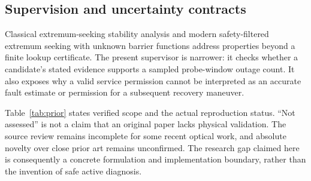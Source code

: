 \subsection{Supervision and uncertainty contracts}
Classical extremum-seeking stability analysis \cite{es} and modern safety-filtered extremum seeking with unknown barrier functions \cite{safees} address properties beyond a finite lookup certificate. The present supervisor is narrower: it checks whether a candidate's stated evidence supports a sampled probe-window outage count. It also exposes why a valid service permission cannot be interpreted as an accurate fault estimate or permission for a subsequent recovery maneuver.

Table~\ref{tab:prior} states verified scope and the actual reproduction status. ``Not assessed'' is not a claim that an original paper lacks physical validation. The source review remains incomplete for some recent optical work, and absolute novelty over close prior art remains unconfirmed. The research gap claimed here is consequently a concrete formulation and implementation boundary, rather than the invention of safe active diagnosis.

